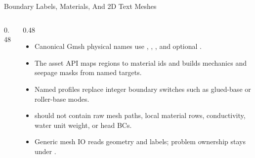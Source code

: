 \documentclass[aspectratio=169,10pt]{beamer}
\begin{document}
\begin{frame}{Boundary Labels, Materials, And 2D Text Meshes}
\small
\begin{columns}[T,totalwidth=\textwidth]
\begin{column}{0.48\textwidth}
\begin{pseudobox}
\\
\\
\\
\\
\\
\\
\\
\code{)}
\end{pseudobox}
\end{column}
\begin{column}{0.48\textwidth}
\begin{softbox}
\begin{itemize}
  \item Canonical Gmsh physical names use , , , and optional .
  \item The asset API maps regions to material ids and builds mechanics and seepage masks from named targets.
  \item Named profiles replace integer boundary switches such as glued-base or roller-base modes.
  \item {} should not contain raw mesh paths, local material rows, conductivity, water unit weight, or head BCs.
  \item Generic mesh IO reads geometry and labels; problem ownership stays under .
\end{itemize}
\end{softbox}
\end{column}
\end{columns}
\end{frame}
\end{document}
